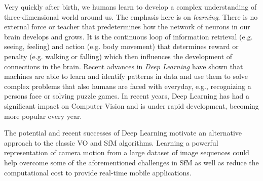 		Very quickly after birth, we humans learn to develop a complex understanding of three-dimensional world around us. 
		The emphasis here is on \emph{learning}.
		There is no external force or teacher that predetermines how the network of neurons in our brain develops and grows.
		It is the continuous loop of information retrieval (e.g. seeing, feeling) and action (e.g. body movement) that determines reward or penalty (e.g. walking or falling) which then influences the development of connections in the brain.
		Recent advances in \emph{Deep Learning} have shown that machines are able to learn and identify patterns in data and use them to solve complex problems that also humans are faced with everyday, e.g., recognizing a persons face or solving puzzle games.
		In recent years, Deep Learning has had a significant impact on Computer Vision and is under rapid development, becoming more popular every year.
		
		The potential and recent successes of Deep Learning motivate an alternative approach to the classic VO and SfM algorithms.
		Learning a powerful representation of camera motion from a large dataset of image sequences could help overcome some of the aforementioned challenges in SfM as well as reduce the computational cost to provide real-time mobile applications.
		
		
		
		
		
		
